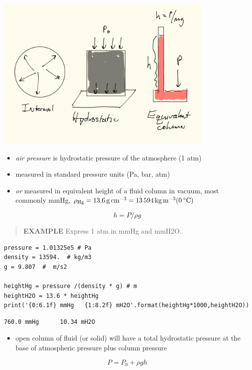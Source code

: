 \documentclass[11pt]{article}
\begin{document}
\includegraphics[width=0.8\textwidth]{./figs/Pressure.png}

\begin{itemize}
\item \emph{air pressure} is hydrostatic pressure of the atmosphere (1 atm)
\item measured in standard pressure units (Pa, bar, atm)
\item \emph{or} measured in equivalent height of a fluid column in vacuum, most commonly mmHg, \(\rho_{\ce{Hg}} = \SI{13.6}{\gram\per\cm\cubed} = \SI{13594}{\kilogram\per\meter\cubed} (\SI{0}{\celsius}) \)
\end{itemize}

\begin{framed}
\[ h = P / \rho  g \]
\end{framed}

\begin{quote}
\textbf{EXAMPLE} Express 1 atm in mmHg and mmH2O.
\end{quote}

\begin{verbatim}
pressure = 1.01325e5 # Pa
density = 13594.  # kg/m3
g = 9.807  #  m/s2

heightHg = pressure /(density * g) # m
heightH2O = 13.6 * heightHg
print('{0:6.1f} mmHg   {1:8.2f} mH2O'.format(heightHg*1000,heightH2O))
\end{verbatim}

\begin{verbatim}
760.0 mmHg      10.34 mH2O
\end{verbatim}

\begin{itemize}
\item open column of fluid (or solid) will have a total hydrostatic pressure at the base of atmospheric pressure plus column pressure
\end{itemize}
\[ P = P_{0} + \rho g h \]
\end{document}
